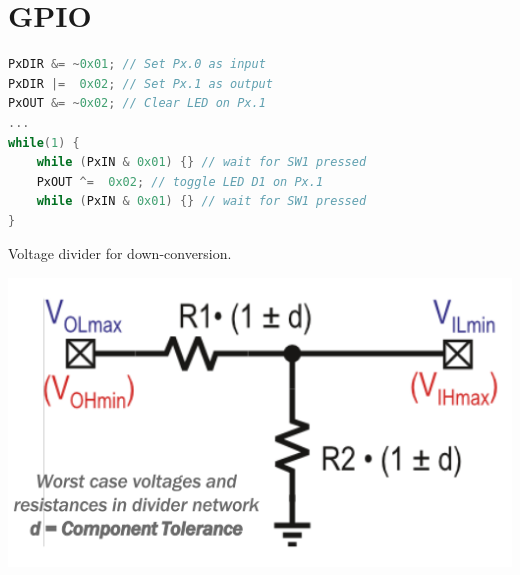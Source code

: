 \section{GPIO }
\begin{lstlisting}[language=C++]
PxDIR &= ~0x01;	// Set Px.0 as input
PxDIR |=  0x02;	// Set Px.1 as output
PxOUT &= ~0x02;	// Clear LED on Px.1
...
while(1) {
	while (PxIN & 0x01) {} // wait for SW1 pressed
	PxOUT ^=  0x02; // toggle LED D1 on Px.1
	while (PxIN & 0x01) {} // wait for SW1 pressed
}
\end{lstlisting}\vspace{-25px}

Voltage divider for down-conversion.
\begin{center}
	\includegraphics[width=.6\columnwidth]{"Images/Voltage_Divider.png"}
\end{center}






